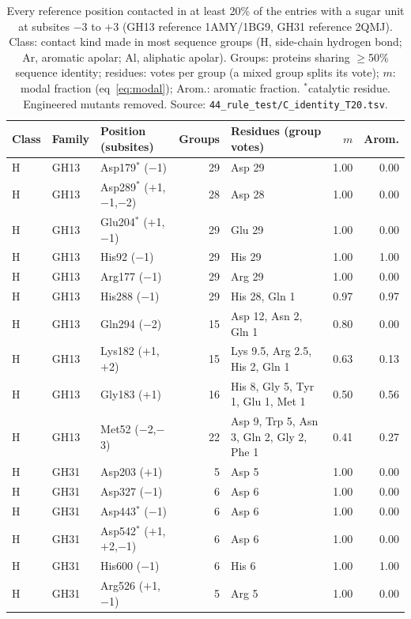 \documentclass[preprint,12pt]{elsarticle}
\begin{document}
\begin{table}[p]
\centering\renewcommand{\baselinestretch}{1}\scriptsize\setlength{\tabcolsep}{3pt}
\caption{Every reference position contacted in at least 20\% of the entries with a sugar unit at subsites $-3$ to $+3$ (GH13 reference 1AMY/1BG9, GH31 reference 2QMJ). Class: contact kind made in most sequence groups (H, side-chain hydrogen bond; Ar, aromatic apolar; Al, aliphatic apolar). Groups: proteins sharing $\ge$50\% sequence identity; residues: votes per group (a mixed group splits its vote); $m$: modal fraction (eq~\ref{eq:modal}); Arom.: aromatic fraction. $^\ast$catalytic residue. Engineered mutants removed. Source: \texttt{44\_rule\_test/C\_identity\_T20.tsv}.}
\label{tab:rule}
\begin{tabular}{lllrp{4.6cm}rr}
\toprule
Class & Family & Position (subsites) & Groups & Residues (group votes) & $m$ & Arom.\\
\midrule
H & GH13 & Asp179$^\ast$ ($-$1) & 29 & Asp 29 & 1.00 & 0.00\\
H & GH13 & Asp289$^\ast$ ($+$1,$-$1,$-$2) & 28 & Asp 28 & 1.00 & 0.00\\
H & GH13 & Glu204$^\ast$ ($+$1,$-$1) & 29 & Glu 29 & 1.00 & 0.00\\
H & GH13 & His92 ($-$1) & 29 & His 29 & 1.00 & 1.00\\
H & GH13 & Arg177 ($-$1) & 29 & Arg 29 & 1.00 & 0.00\\
H & GH13 & His288 ($-$1) & 29 & His 28, Gln 1 & 0.97 & 0.97\\
H & GH13 & Gln294 ($-$2) & 15 & Asp 12, Asn 2, Gln 1 & 0.80 & 0.00\\
H & GH13 & Lys182 ($+$1,$+$2) & 15 & Lys 9.5, Arg 2.5, His 2, Gln 1 & 0.63 & 0.13\\
H & GH13 & Gly183 ($+$1) & 16 & His 8, Gly 5, Tyr 1, Glu 1, Met 1 & 0.50 & 0.56\\
H & GH13 & Met52 ($-$2,$-$3) & 22 & Asp 9, Trp 5, Asn 3, Gln 2, Gly 2, Phe 1 & 0.41 & 0.27\\
H & GH31 & Asp203 ($+$1) & 5 & Asp 5 & 1.00 & 0.00\\
H & GH31 & Asp327 ($-$1) & 6 & Asp 6 & 1.00 & 0.00\\
H & GH31 & Asp443$^\ast$ ($-$1) & 6 & Asp 6 & 1.00 & 0.00\\
H & GH31 & Asp542$^\ast$ ($+$1,$+$2,$-$1) & 6 & Asp 6 & 1.00 & 0.00\\
H & GH31 & His600 ($-$1) & 6 & His 6 & 1.00 & 1.00\\
H & GH31 & Arg526 ($+$1,$-$1) & 5 & Arg 5 & 1.00 & 0.00\\

\end{tabular}
\end{table}
\end{document}
